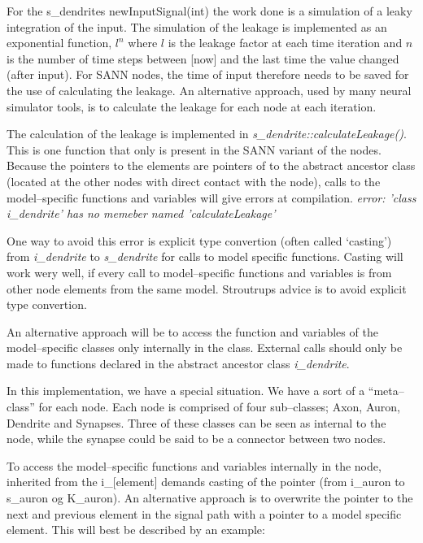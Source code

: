 	For the s\_dendrites newInputSignal(int) the work done is a simulation of a leaky integration of the input. 
	The simulation of the leakage is implemented as an exponential function, $l^n$ where $l$ is the leakage factor at each time iteration and $n$ is the number of time steps between [now] and the last time the value changed (after input).
	For SANN nodes, the time of input therefore needs to be saved for the use of calculating the leakage. An alternative approach, used by many neural simulator tools, is to calculate the leakage for each node at each iteration.
	
	The calculation of the leakage is implemented in \emph{s\_dendrite::calculateLeakage()}. This is one function that only is present in the SANN variant of the nodes. 
	Because the pointers to the elements are pointers of to the abstract ancestor class (located at the other nodes with direct contact with the node), calls to the model--specific functions and variables will give errors at compilation.
	\newline \emph{error: 'class i\_dendrite' has no memeber named 'calculateLeakage'}

	One way to avoid this error is explicit type convertion (often called `casting') from \emph{i\_dendrite} to \emph{s\_dendrite} for calls to model specific functions.
	Casting will work wery well, if every call to model--specific functions and variables is from other node elements from the same model.
	Stroutrups advice is to avoid explicit type convertion\cite{Stroustrup2000KAP6}. 
	
	An alternative approach will be to access the function and variables of the model--specific classes only internally in the class. 
	External calls should only be made to functions declared in the abstract ancestor class \emph{i\_dendrite}.

	In this implementation, we have a special situation. We have a sort of a ``meta--class'' for each node. Each node is comprised of four sub--classes; Axon, Auron, Dendrite and Synapses. 
	Three of these classes can be seen as internal to the node, while the synapse could be said to be a connector between two nodes.

	To access the model--specific functions and variables internally in the node, inherited from the i\_[element] demands casting of the pointer (from i\_auron to s\_auron og K\_auron). 
	An alternative approach is to overwrite the pointer to the next and previous element in the signal path with a pointer to a model specific element.
	This will best be described by an example:

